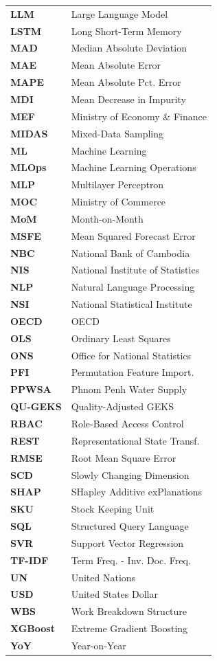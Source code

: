 \begin{minipage}[t]{0.48\textwidth}
\small
\begin{tabular}{@{} >{\bfseries}l @{\hspace{0.35cm}} l @{}}
LLM      & Large Language Model \\
LSTM     & Long Short-Term Memory \\
MAD      & Median Absolute Deviation \\
MAE      & Mean Absolute Error \\
MAPE     & Mean Absolute Pct. Error \\
MDI      & Mean Decrease in Impurity \\
MEF      & Ministry of Economy \& Finance \\
MIDAS    & Mixed-Data Sampling \\
ML       & Machine Learning \\
MLOps    & Machine Learning Operations \\
MLP      & Multilayer Perceptron \\
MOC      & Ministry of Commerce \\
MoM      & Month-on-Month \\
MSFE     & Mean Squared Forecast Error \\
NBC      & National Bank of Cambodia \\
NIS      & National Institute of Statistics \\
NLP      & Natural Language Processing \\
NSI      & National Statistical Institute \\
OECD     & OECD \\
OLS      & Ordinary Least Squares \\
ONS      & Office for National Statistics \\
PFI      & Permutation Feature Import. \\
PPWSA    & Phnom Penh Water Supply \\
QU-GEKS  & Quality-Adjusted GEKS \\
RBAC     & Role-Based Access Control \\
REST     & Representational State Transf. \\
RMSE     & Root Mean Square Error \\
SCD      & Slowly Changing Dimension \\
SHAP     & SHapley Additive exPlanations \\
SKU      & Stock Keeping Unit \\
SQL      & Structured Query Language \\
SVR      & Support Vector Regression \\
TF-IDF   & Term Freq. - Inv. Doc. Freq. \\
UN       & United Nations \\
USD      & United States Dollar \\
WBS      & Work Breakdown Structure \\
XGBoost  & Extreme Gradient Boosting \\
YoY      & Year-on-Year \\
\end{tabular}
\end{minipage}